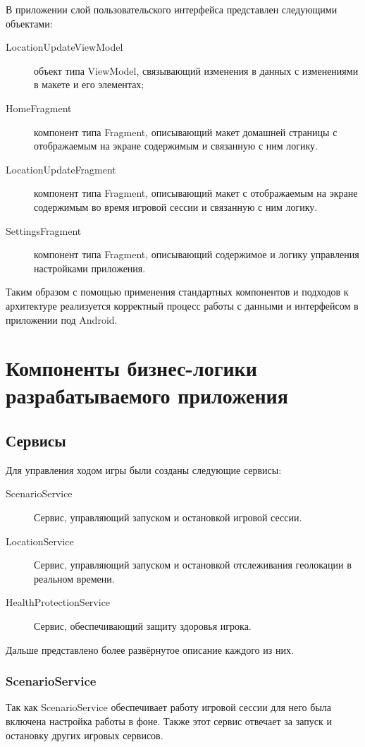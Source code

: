 В приложении слой пользовательского интерфейса представлен следующими объектами:
\begin{description}
	\item[LocationUpdateViewModel] объект типа ViewModel, связывающий изменения в данных с изменениями в макете и его элементах;
	\item[HomeFragment] компонент типа Fragment, описывающий макет домашней страницы с отображаемым на экране содержимым и связанную с ним логику.
	\item[LocationUpdateFragment] компонент типа Fragment, описывающий макет с отображаемым на экране содержимым во время игровой сессии и связанную с ним логику.
	\item[SettingsFragment] компонент типа Fragment, описывающий содержимое и логику управления настройками приложения.
\end{description}
\smallskip
Таким образом с помощью применения стандартных компонентов и подходов к архитектуре реализуется корректный процесс работы с данными и интерфейсом в приложении под Android. 


\section{Компоненты бизнес-логики разрабатываемого приложения}
\subsection*{Сервисы}
Для управления ходом игры были созданы следующие сервисы:
\begin{description}
	\item[ScenarioService] Сервис, управляющий запуском и остановкой игровой сессии.
	\item[LocationService] Сервис, управляющий запуском и остановкой отслеживания геолокации в реальном времени.
	\item[HealthProtectionService] Сервис, обеспечивающий защиту здоровья игрока.
\end{description}
\smallskip
Дальше представлено более развёрнутое описание каждого из них.

\subsubsection*{ScenarioService}
Так как ScenarioService обеспечивает работу игровой сессии для него была включена настройка работы в фоне. Также этот сервис отвечает за запуск и остановку других игровых сервисов. 

